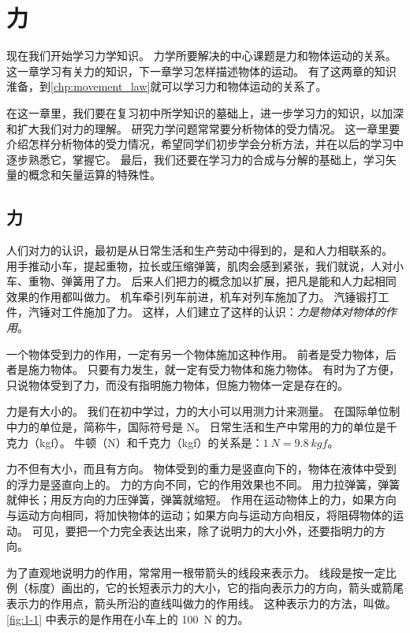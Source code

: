 \chapter{力}\label{chp:Force}
现在我们开始学习力学知识。
力学所要解决的中心课题是力和物体运动的关系。
这一章学习有关力的知识，下一章学习怎样描述物体的运动。
有了这两章的知识淮备，到\cref{chp:movement_law}就可以学习力和物体运动的关系了。

在这一章里，我们要在复习初中所学知识的墓础上，进一步学习力的知识，以加深和扩大我们对力的理解。
研究力学问题常常要分析物体的受力情况。
这一章里要介绍怎样分析物体的受力情况，希望同学们初步学会分析方法，并在以后的学习中逐步熟悉它，掌握它。
最后，我们还要在学习力的合成与分解的基础上，学习矢量的概念和矢量运算的特殊性。

\section{力}
人们对力的认识，最初是从日常生活和生产劳动中得到的，是和人力相联系的。
用手推动小车，提起重物，拉长或压缩弹簧，肌肉会感到紧张，我们就说，人对小车、重物、弹簧用了力。
后来人们把力的概念加以扩展，把凡是能和人力起相同效果的作用都叫做力。
机车牵引列车前进，机车对列车施加了力。
汽锤锻打工件，汽锤对工件施加了力。
这样，人们建立了这样的认识：\emph{力是物体对物体的作用}。

一个物体受到力的作用，一定有另一个物体施加这种作用。
前者是受力物体，后者是施力物体。
只要有力发生，就一定有受力物体和施力物体。
有时为了方便，只说物体受到了力，而没有指明施力物体，但施力物体一定是存在的。

力是有大小的。
我们在初中学过，力的大小可以用测力计来测量。
在国际单位制中力的单位是，简称牛，国际符号是 \unit{N}。
日常生活和生产中常用的力的单位是千克力（\unit{kgf}）。
牛顿（\unit{N}）和千克力（\unit{kgf}）的关系是：$\qty{1}{N}=\qty{9.8}{kgf}$。

力不但有大小，而且有方向。
物体受到的重力是竖直向下的，物体在液体中受到的浮力是竖直向上的。
力的方向不同，它的作用效果也不同。
用力拉弹簧，弹簧就伸长；用反方向的力压弹簧，弹簧就缩短。
作用在运动物体上的力，如果方向与运动方向相同，将加快物体的运动；如果方向与运动方向相反，将阻碍物体的运动。
可见，要把一个力完全表达出来，除了说明力的大小外，还要指明力的方向。

为了直观地说明力的作用，常常用一根带箭头的线段来表示力。
线段是按一定比例（标度）画出的，它的长短表示力的大小，它的指向表示力的方向，箭头或箭尾表示力的作用点，箭头所沿的直线叫做力的作用线。
这种表示力的方法，叫做。
\cref{fig:1-1} 中表示的是作用在小车上的 \qty{100}{N} 的力。

